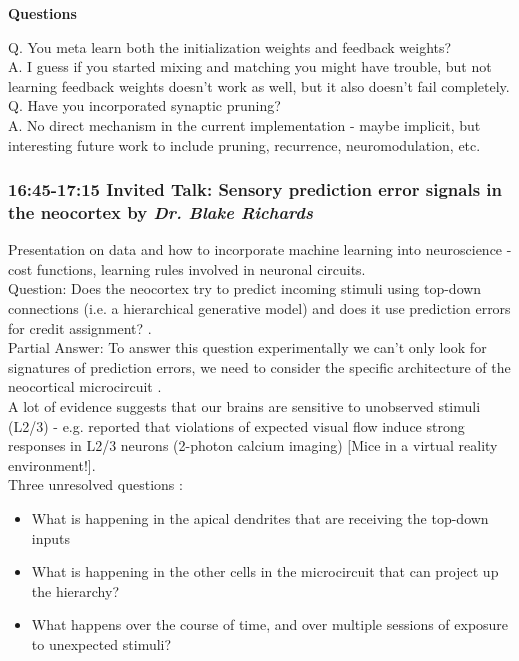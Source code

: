 \documentclass[12pt]{article}
\begin{document}
\textbf{Questions} 

Q. You meta learn both the initialization weights and feedback weights? \\

A. I guess if you started mixing and matching you might have trouble, but not learning feedback weights doesn't work as well, but it also doesn't fail completely. \\

Q. Have you incorporated synaptic pruning? \\

A. No direct mechanism in the current implementation - maybe implicit, but interesting future work to include pruning, recurrence, neuromodulation, etc. \\


\subsubsection{16:45-17:15 Invited Talk: Sensory prediction error signals in the neocortex by \textit{Dr. Blake Richards}}

Presentation on data and how to incorporate machine learning into neuroscience - cost functions, learning rules involved in neuronal circuits. \\

Question: Does the neocortex try to predict incoming stimuli using top-down connections (i.e. a hierarchical generative model) and does it use prediction errors for credit assignment? \cite{Lotter16}. \\

Partial Answer: To answer this question experimentally we can't only look for signatures of prediction errors, we need to consider the specific architecture of the neocortical microcircuit \cite{Harris13}. \\

A lot of evidence suggests that our brains are sensitive to unobserved stimuli (L2/3) - e.g. \cite{Zmarz16, Homann17} reported that violations of expected visual flow induce strong responses in L2/3 neurons (2-photon calcium imaging) [Mice in a virtual reality environment!]. \\

Three unresolved questions \cite{Harris13}:
\begin{itemize}
    \item What is happening in the apical dendrites that are receiving the top-down inputs
    \item What is happening in the other cells in the microcircuit that can project up the hierarchy?
    \item What happens over the course of time, and over multiple sessions of exposure to unexpected stimuli?
\end{itemize}
\end{document}
